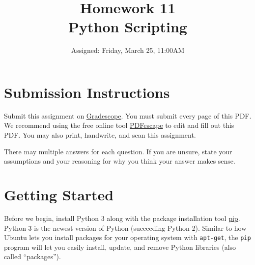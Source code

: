 \documentclass{article}
\begin{document}
\fancyhead[L]{}
\fancyhead[R]{}

\fancyfoot[C]{\color{gray} \thepage~/~\pageref*{LastPage}}
\pagestyle{fancyplain}



\title{\textbf{Homework 11\\Python Scripting}}
\author{Assigned: Friday, March 25, 11:00AM}
\date{\textbf{\color{red}{Due: Friday, April 1, 11:00AM (Hard Deadline)}}}
\maketitle


\section*{Submission Instructions}
Submit this assignment on \href{https://gradescope.com/courses/2248}{Gradescope}.
You must submit every page of this PDF.
We recommend using the free online tool \href{https://www.pdfescape.com}{PDFescape}
to edit and fill out this PDF.
You may also print, handwrite, and scan this assignment.

\medskip
\noindent
There may multiple answers for each question. If you are unsure,
state your assumptions and your reasoning for why you think your answer
makes sense.


\section{Getting Started}
Before we begin, install Python 3 along with the package installation tool \href{https://pypi.python.org/pypi/pip}{pip}. Python 3 is the newest version of Python (succeeding Python 2). Similar to how Ubuntu lets you install packages for your operating system with \texttt{apt-get}, the \texttt{pip} program will let you easily install, update, and remove Python libraries (also called ``packages''). \\
\medskip 
\end{document}

